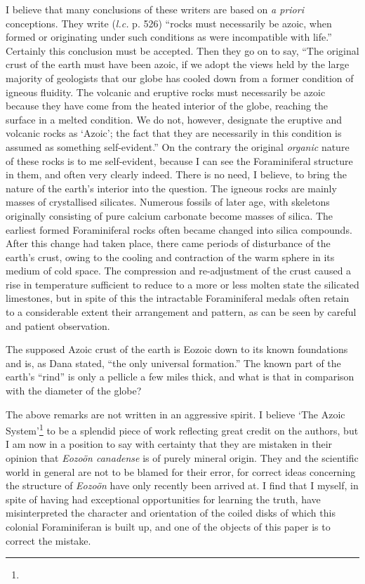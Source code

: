 \documentclass[a4paper, 12pt, oneside]{article}
\begin{document}
I believe that many conclusions of these writers are based on \emph{a priori} conceptions. They write (\emph{l.c.} p. 526) ``rocks must necessarily be azoic, when formed or originating under such conditions as were incompatible with life.'' Certainly this conclusion must be accepted. Then they go on to say, ``The original crust of the earth must have been azoic, if we adopt the views held by the large majority of geologists that our globe has cooled down from a former condition of igneous fluidity. The volcanic and eruptive rocks must necessarily be azoic because they have come from the heated interior of the globe, reaching the surface in a melted condition. We do not, however, designate the eruptive and volcanic rocks as `Azoic'; the fact that they are necessarily in this condition is assumed as something self-evident.'' On the contrary the original \emph{organic} nature of these rocks is to me self-evident, because I can see the Foraminiferal structure in them, and often very clearly indeed. There is no need, I believe, to bring the nature of the earth's interior into the question. The igneous rocks are mainly masses of crystallised silicates. Numerous fossils of later age, with skeletons originally consisting of pure calcium carbonate become masses of silica. The earliest formed Foraminiferal rocks often became changed into silica compounds. After this change had taken place, there came periods of disturbance of the earth's crust, owing to the cooling and contraction of the warm sphere in its medium of cold space. The compression and re-adjustment of the crust caused a rise in temperature sufficient to reduce to a more or less molten state the silicated limestones, but in spite of this the intractable Foraminiferal medals often retain to a considerable extent their arrangement and pattern, as can be seen by careful and patient observation.

The supposed Azoic crust of the earth is Eozoic down to its known foundations and is, as Dana stated, ``the only universal formation.'' The known part of the earth's ``rind'' is only a pellicle a few miles thick, and what is that in comparison with the diameter of the globe?

The above remarks are not written in an aggressive spirit. I believe `The Azoic System'\footnote{} to be a splendid piece of work reflecting great credit on the authors, but I am now in a position to say with certainty that they are mistaken in their opinion that \emph{Eozoön canadense} is of purely mineral origin. They and the scientific world in general are not to be blamed for their error, for correct ideas concerning the structure of \emph{Eozoön} have only recently been arrived at. I find that I myself, in spite of having had exceptional opportunities for learning the truth, have misinterpreted the character and orientation of the coiled disks of which this colonial Foraminiferan is built up, and one of the objects of this paper is to correct the mistake.
\end{document}
